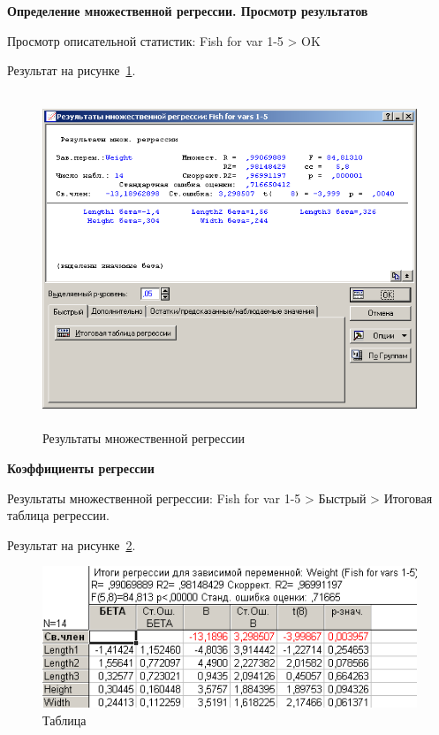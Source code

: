 \newpage

\begin{center}
  \textbf{Определение множественной регрессии. Просмотр результатов}
\end{center}

Просмотр описательной статистик: Fish for var 1-5 > OK

Результат на рисунке~\ref{fig:var5__20}.

\begin{figure}[!h]
  \centering

  \includegraphics[height=10cm]
  {inc/var5__20.PNG}

  \caption{Результаты множественной регрессии}

  \label{fig:var5__20}
\end{figure}

\newpage

\begin{center}
  \textbf{Коэффициенты регрессии}
\end{center}

Результаты множественной регрессии: Fish for var 1-5 > Быстрый > Итоговая таблица регрессии.

Результат на рисунке~\ref{fig:var5__21}.

\begin{figure}[!h]
  \centering

  \includegraphics[width=12cm]
  {inc/var5__21.PNG}

  \caption{Таблица}

  \label{fig:var5__21}
\end{figure}

